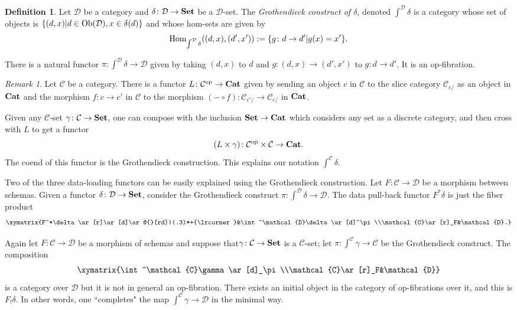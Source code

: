 \documentclass{amsart}
\makeatletter
\def\tn{\textnormal}
\def\mc{\mathcal}
\def\Hom{\tn{Hom}}
\def\Ob{\tn{Ob}}
\def\to{\rightarrow}
\def\cross{\times}
\def\taking{\colon}
\def\op{^\tn{op}}
\def\ullimit{\ar@{}[rd]|(.3)*+{\lrcorner}}
\def\Cat{{\bf Cat}}
\def\Set{{\bf Set}}
\def\mcC{\mc{C}}
\def\mcD{\mc{D}}
\theoremstyle{remark}
\newtheorem{remark}[theorem]{Remark}
\theoremstyle{definition}
\newtheorem{definition}[theorem]{Definition}
\makeatother
\begin{document}
\begin{definition}

Let $\mcD$ be a category and $\delta\taking\mcD\to\Set$ be a $\mcD$-set.  The {\em Grothendieck construct of $\delta$}, denoted $\int^\mcD\delta$ is a category whose set of objects is $\{(d,x) | d\in\Ob(\mcD), x\in\delta(d)\}$ and whose hom-sets are given by $$\Hom_{\int^\mcD\delta}((d,x),(d',x')):=\{g\taking d\to d' | g(x) = x'\}.$$

There is a natural functor $\pi\taking\int^\mcD\delta\to\mcD$ given by taking $(d,x)$ to $d$ and $g\taking(d,x)\to(d',x')$ to $g\taking d\to d'$.  It is an op-fibration.

\end{definition}

\begin{remark}

Let $\mcC$ be a category.  There is a functor $L\taking\mcC\op\to\Cat$ given by sending an object $c$ in $\mcC$ to the slice category $\mcC_{c/}$ as an object in $\Cat$ and the morphism $f\taking c\to c'$ in $\mcC$ to the morphism $(-\circ f)\taking\mcC_{c'/}\to\mcC_{c/}$ in $\Cat$.  

Given any $\mcC$-set $\gamma\taking\mcC\to\Set$, one can compose with the inclusion $\Set\to\Cat$ which considers any set as a discrete category, and then cross with $L$ to get a functor $$(L\cross\gamma)\taking\mcC\op\cross\mcC\to\Cat.$$  The coend of this functor is the Grothendieck construction.  This explains our notation $\int^\mcC\delta$.

\end{remark}

Two of the three data-loading functors can be easily explained using the Grothendieck construction.  Let $F\taking\mcC\to\mcD$ be a morphism between schemas.  Given a functor $\delta\taking\mcD\to\Set$, consider the Grothendieck construct $\pi\taking\int^\mcD\delta\to\mcD$.  The data pull-back functor $F^*\delta$ is just the fiber product $$\xymatrix{F^*\delta\ar[r]\ar[d]\ullimit&\int^\mcD\delta\ar[d]^\pi\\\mcC\ar[r]_F&\mcD.}$$

Again let $F\taking\mcC\to\mcD$ be a morphism of schemas and suppose that$\gamma\taking\mcC\to\Set$ is a $\mcC$-set; let $\pi\taking\int^\mcC\gamma\to\mcC$ be the Grothendieck construct.  The composition $$\xymatrix{\int^\mcC\gamma\ar[d]_\pi\\\mcC\ar[r]_F&\mcD}$$ is a category over $\mcD$ but it is not in general an op-fibration.  There exists an initial object in the category of op-fibrations over it, and this is $F_!\delta$.  In other words, one ``completes" the map $\int^\mcC\gamma\to\mcD$ in the minimal way.
\end{document}
